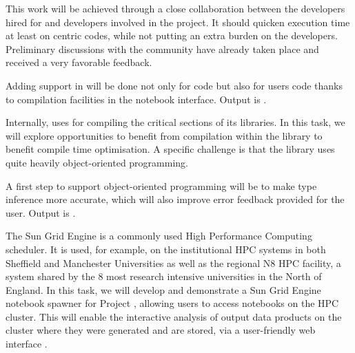 \begin{workpackage}
\begin{tasklist}
\begin{task}[title=Pythran,id=pythran,lead=LL,partners={UJF},PM=24, wphases=0-24, issue=105]
  This work will be achieved through a close collaboration between the \Pythran
  developers hired for \TheProject and \Cython developers involved in the \Sage
  project. It should quicken \Sage execution time at least on \Numpy centric
  codes, while not putting an extra burden on the developers.  Preliminary
  discussions with the \Cython community have already taken place and received a
  very favorable feedback.

  Adding \Pythran support in \Sage will be done not only for \Sage code but also
  for \Sage users code thanks to compilation facilities in the notebook interface.
  Output is .


  Internally, \Sage uses \Cython for compiling the critical sections of
  its libraries. In this task, we will explore opportunities to
  benefit from \Pythran compilation within the \Sage library to benefit
  \Pythran compile time optimisation. A specific challenge is that the \Sage
  library uses quite heavily object-oriented programming.

  A first step to support object-oriented programming will be to make
  \Pythran type inference more accurate, which will also improve error
  feedback provided for the user. Output is .
\end{task}

\begin{task}[title=Sun Grid Engine Integration in Project \Jupyter Hub, lead=USH,id=hpc-jupyter,PM=12,wphases=0-12,issue=106]
The Sun Grid Engine is a commonly used High Performance Computing
scheduler. It is used, for example, on the institutional HPC systems
in both Sheffield and Manchester Universities as well as the regional
N8 HPC facility, a system shared by the 8 most research intensive
universities in the North of England. In this task, we will develop
and demonstrate a Sun Grid Engine notebook spawner for Project
\Jupyter, allowing users to access \Jupyter notebooks on the HPC
cluster. This will enable the interactive analysis of output data
products on the cluster where they were generated and are stored, via
a user-friendly web interface .
\end{task}
\end{tasklist}


\end{workpackage}
